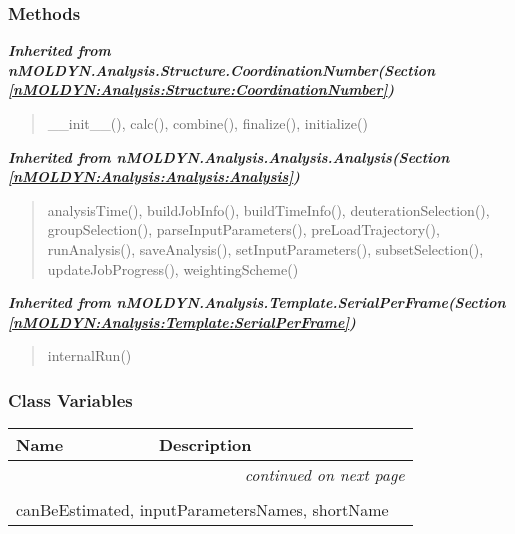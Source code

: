 
  \subsubsection{Methods}


\large{\textbf{\textit{Inherited from nMOLDYN.Analysis.Structure.CoordinationNumber\textit{(Section \ref{nMOLDYN:Analysis:Structure:CoordinationNumber})}}}}

\begin{quote}
\_\_init\_\_(), calc(), combine(), finalize(), initialize()
\end{quote}

\large{\textbf{\textit{Inherited from nMOLDYN.Analysis.Analysis.Analysis\textit{(Section \ref{nMOLDYN:Analysis:Analysis:Analysis})}}}}

\begin{quote}
analysisTime(), buildJobInfo(), buildTimeInfo(), deuterationSelection(), groupSelection(), parseInputParameters(), preLoadTrajectory(), runAnalysis(), saveAnalysis(), setInputParameters(), subsetSelection(), updateJobProgress(), weightingScheme()
\end{quote}

\large{\textbf{\textit{Inherited from nMOLDYN.Analysis.Template.SerialPerFrame\textit{(Section \ref{nMOLDYN:Analysis:Template:SerialPerFrame})}}}}

\begin{quote}
internalRun()
\end{quote}


  \subsubsection{Class Variables}

    \vspace{-1cm}
\hspace{\varindent}\begin{longtable}{|p{\varnamewidth}|p{\vardescrwidth}|l}
\cline{1-2}
\cline{1-2} \centering \textbf{Name} & \centering \textbf{Description}& \\
\cline{1-2}
\endhead\cline{1-2}\multicolumn{3}{r}{\small\textit{continued on next page}}\\\endfoot\cline{1-2}
\endlastfoot\multicolumn{2}{|l|}{\textit{Inherited from nMOLDYN.Analysis.Structure.CoordinationNumber \textit{(Section \ref{nMOLDYN:Analysis:Structure:CoordinationNumber})}}}\\
\multicolumn{2}{|p{\varwidth}|}{\raggedright canBeEstimated, inputParametersNames, shortName}\\
\cline{1-2}
\end{longtable}

